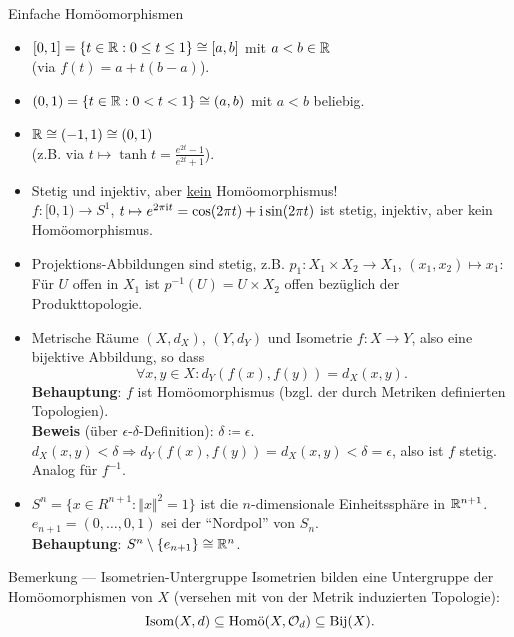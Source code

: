 \begin{example}{Einfache Homöomorphismen}
  \begin{itemize}
    \item $ [0,1] = \{ t \in \mathbb{R} : 0 \leq t \leq 1 \} \cong [a,b] $ mit $ a < b \in \mathbb{R} $ \\ (via $ f(t) = a+t(b-a) $).
    \item $ (0,1) = \{ t \in \mathbb{R} : 0 < t < 1 \} \cong (a,b) $ mit $ a < b $ beliebig. 
    \item $ \mathbb{R} \cong (-1, 1) \cong (0,1) $ \\ (z.B. via $ t \mapsto \tanh t = \tfrac{e^{2t}-1}{e^{2t}+1} $).
    \item Stetig und injektiv, aber \underline{kein} Homöomorphismus! \\
      $ f: [0,1) \to S^1 $, $ t \mapsto e^{2\pi\text{\rmfamily i} t} = \cos(2\pi t) + \text{\rmfamily i}\sin(2\pi t) $ ist stetig, injektiv, aber kein Homöomorphismus.
    \item Projektions-Abbildungen sind stetig, z.B. $ p_1: X_1 \times X_2 \to X_1 $, $ (x_1,x_2) \mapsto x_1 $: Für $ U $ offen in $ X_1 $ ist $ p^{-1}(U) = U \times X_2 $ offen bezüglich der Produkttopologie.
    \item Metrische Räume $ (X, d_X) $, $ (Y, d_Y) $ und Isometrie $ f: X \to Y $, also eine bijektive Abbildung, so dass
      \begin{equation*}
        \forall x, y \in X : d_Y(f(x), f(y)) = d_X(x, y)\text{.}
      \end{equation*}
      \textbf{Behauptung}: $ f $ ist Homöomorphismus (bzgl. der durch Metriken definierten Topologien). \\
      \textbf{Beweis} (über $ \epsilon $-$ \delta $-Definition): $ \delta \coloneqq \epsilon $. \\
        $ d_X(x, y) < \delta \Rightarrow d_Y(f(x), f(y)) = d_X(x,y) < \delta = \epsilon $, also ist $ f $ stetig. \\
        Analog für $ f^{-1} $.
    \item $ S^n = \{ x \in R^{n+1} : \Vert x \Vert^2 = 1 \} $ ist die $ n $-dimensionale Einheitssphäre in $ \mathbb{R}^{n+1} $. \\
      $ e_{n+1} = (0,\dots,0,1) $ sei der ``Nordpol'' von $ S_n $. \\
      \textbf{Behauptung}: $ S^n\setminus\{ e_{n+1} \} \cong \mathbb{R}^n $.
  \end{itemize}
\end{example}

\begin{bla}{Bemerkung --- Isometrien-Untergruppe}
  Isometrien bilden eine Untergruppe der Homöomorphismen von $ X $ (versehen mit von der Metrik induzierten Topologie):
  \begin{equation*}
    \text{Isom}(X, d) \subseteq \text{Homö}(X, \mathcal{O}_d) \subseteq \text{Bij}(X)\text{.}
  \end{equation*}
\end{bla}